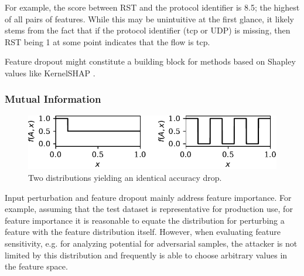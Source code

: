 \documentclass[conference]{IEEEtran}
\begin{document}
For example, the score between RST and the protocol identifier is 8.5; the highest of all pairs of features. While this may be unintuitive at the first glance, it likely stems from the fact that if the protocol identifier (\gls{tcp} or UDP) is missing, then 
RST being 1 at some point indicates that the flow is \gls{tcp}.

Feature dropout might constitute a building block for methods based on Shapley values \cite{shapley_value_1953} like KernelSHAP \cite{lundberg_unified_2017}. 
\subsubsection{Mutual Information}
\begin{figure}
\includegraphics[width=\columnwidth]{../plots/mutinfo_example.pdf}
\caption{Two distributions yielding an identical accuracy drop.}
\label{fig:mutinfo_example}
\end{figure}
Input perturbation and feature dropout mainly address feature importance.
For example, assuming that the test dataset is representative for production use, for feature importance it is reasonable to equate the distribution for perturbing a feature with the feature distribution itself. However, when evaluating feature sensitivity, e.g. for analyzing potential for adversarial samples, the attacker is not limited by this distribution and frequently is able to choose arbitrary values in the feature space.
\end{document}
